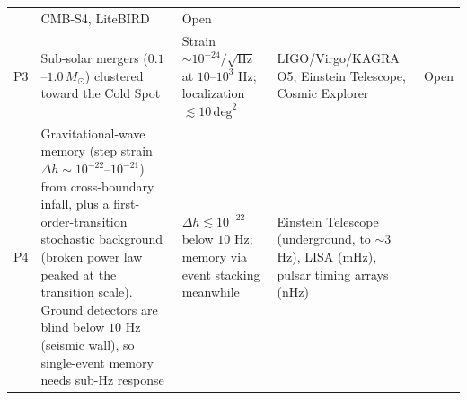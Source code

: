 \documentclass[
]{article}
\begin{document}
\begin{longtable}[]{@{}lllll@{}}
\begin{minipage}[t]{0.19\columnwidth}
\end{minipage} & \begin{minipage}[t]{0.19\columnwidth}\raggedright
CMB-S4, LiteBIRD\strut
\end{minipage} & \begin{minipage}[t]{0.19\columnwidth}\raggedright
Open\strut
\end{minipage}\tabularnewline
\begin{minipage}[t]{0.11\columnwidth}\raggedright
P3\strut
\end{minipage} & \begin{minipage}[t]{0.19\columnwidth}\raggedright
Sub-solar mergers (\(0.1\)--\(1.0\,M_\odot\)) clustered toward the Cold
Spot\strut
\end{minipage} & \begin{minipage}[t]{0.19\columnwidth}\raggedright
Strain \(\sim\!10^{-24}/\sqrt{\text{Hz}}\) at \(10\)--\(10^3\) Hz;
localization \(\lesssim 10\,\text{deg}^2\)\strut
\end{minipage} & \begin{minipage}[t]{0.19\columnwidth}\raggedright
LIGO/Virgo/KAGRA O5, Einstein Telescope, Cosmic Explorer\strut
\end{minipage} & \begin{minipage}[t]{0.19\columnwidth}\raggedright
Open\strut
\end{minipage}\tabularnewline
\begin{minipage}[t]{0.11\columnwidth}\raggedright
P4\strut
\end{minipage} & \begin{minipage}[t]{0.19\columnwidth}\raggedright
Gravitational-wave memory (step strain
\(\Delta h \sim 10^{-22}\)--\(10^{-21}\)) from cross-boundary infall,
plus a first-order-transition stochastic background (broken power law
peaked at the transition scale). Ground detectors are blind below \(10\)
Hz (seismic wall), so single-event memory needs sub-Hz response\strut
\end{minipage} & \begin{minipage}[t]{0.19\columnwidth}\raggedright
\(\Delta h \lesssim 10^{-22}\) below \(10\) Hz; memory via event
stacking meanwhile\strut
\end{minipage} & \begin{minipage}[t]{0.19\columnwidth}\raggedright
Einstein Telescope (underground, to \(\sim\!3\) Hz), LISA (mHz), pulsar
timing arrays (nHz)\strut
\end{minipage} & \begin{minipage}[t]{0.19\columnwidth}\raggedright

\end{minipage}
\end{longtable}
\end{document}
